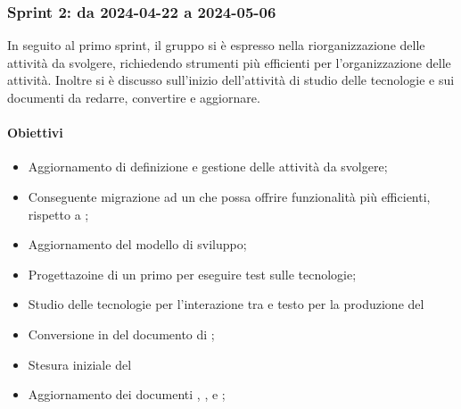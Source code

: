 \subsubsection{Sprint 2: da 2024-04-22 a 2024-05-06}
In seguito al primo sprint, il gruppo si è espresso nella riorganizzazione delle attività da svolgere, richiedendo strumenti più efficienti per l'organizzazione delle attività. Inoltre si è discusso sull'inizio dell'attività di studio delle tecnologie e sui documenti da redarre, convertire e aggiornare.

\paragraph{Obiettivi}
\begin{itemize}
  \item Aggiornamento di definizione e gestione delle attività da svolgere;
  \item Conseguente migrazione ad un  che possa offrire funzionalità più efficienti, rispetto a ;
  \item Aggiornamento del modello di sviluppo;
  \item Progettazoine di un primo  per eseguire test sulle tecnologie;
  \item Studio delle tecnologie per l'interazione tra  e testo per la produzione del 
  \item Conversione in  del documento di \AdR;
  \item Stesura iniziale del \PdQ
  \item Aggiornamento dei documenti \PdP, \NdP, \Glossario e \AdR;
\end{itemize}

\vspace{0.5\baselineskip}
\par [Inserire Gantt]